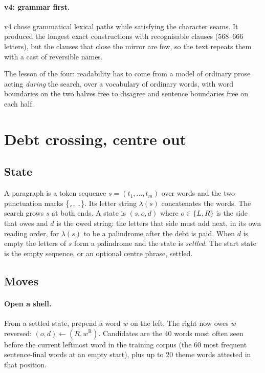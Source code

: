 \documentclass[11pt]{article}
\newcommand{\code}[1]{\texttt{#1}}
\begin{document}
\paragraph{v4: grammar first.} v4 chose grammatical lexical paths while satisfying the character seams. It produced the longest exact constructions with recognisable clauses (568--666 letters), but the clauses that close the mirror are few, so the text repeats them with a cast of reversible names.

The lesson of the four: readability has to come from a model of ordinary prose acting \emph{during} the search, over a vocabulary of ordinary words, with word boundaries on the two halves free to disagree and sentence boundaries free on each half.

\section{Debt crossing, centre out}\label{sec:method}

\subsection{State}
A paragraph is a token sequence $s = (t_1,\dots,t_m)$ over words and the two punctuation marks \{\code{,}, \code{.}\}. Its letter string $\lambda(s)$ concatenates the words. The search grows $s$ at both ends. A state is $(s, o, d)$ where $o \in \{L, R\}$ is the side that owes and $d$ is the owed string: the letters that side must add next, in its own reading order, for $\lambda(s)$ to be a palindrome after the debt is paid. When $d$ is empty the letters of $s$ form a palindrome and the state is \emph{settled}. The start state is the empty sequence, or an optional centre phrase, settled.

\subsection{Moves}
\paragraph{Open a shell.} From a settled state, prepend a word $w$ on the left. The right now owes $w$ reversed: $(o,d) \leftarrow (R, w^{\mathrm{R}})$. Candidates are the 40 words most often seen before the current leftmost word in the training corpus (the 60 most frequent sentence-final words at an empty start), plus up to 20 theme words attested in that position.
\end{document}
